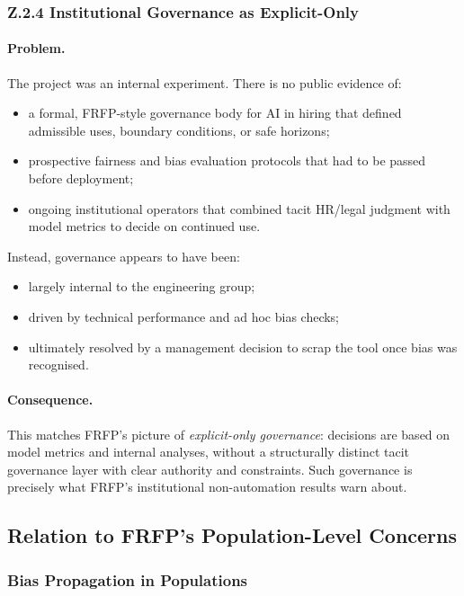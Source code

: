 \subsubsection*{Z.2.4 Institutional Governance as Explicit-Only}

\paragraph{Problem.}
The project was an internal experiment.
There is no public evidence of:

\begin{itemize}
  \item a formal, FRFP-style governance body for AI in hiring that defined
        admissible uses, boundary conditions, or safe horizons;
  \item prospective fairness and bias evaluation protocols that had to be
        passed before deployment;
  \item ongoing institutional operators that combined tacit HR/legal judgment
        with model metrics to decide on continued use.
\end{itemize}

Instead, governance appears to have been:

\begin{itemize}
  \item largely internal to the engineering group;
  \item driven by technical performance and ad hoc bias checks;
  \item ultimately resolved by a management decision to scrap the tool
        once bias was recognised.
\end{itemize}

\paragraph{Consequence.}
This matches FRFP’s picture of \emph{explicit-only governance}:
decisions are based on model metrics and internal analyses, without a
structurally distinct tacit governance layer with clear authority and
constraints.
Such governance is precisely what FRFP’s institutional non-automation results
warn about.

\subsection{Relation to FRFP’s Population-Level Concerns}

\subsubsection*{Bias Propagation in Populations}

